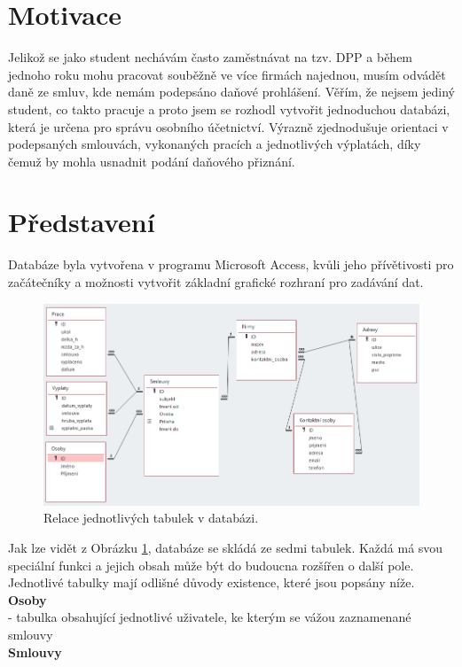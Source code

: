 \documentclass{article}
\begin{document}
	
	
	
	\section{Motivace}
	Jelikož se jako student nechávám často zaměstnávat na tzv. DPP a během jednoho roku mohu pracovat souběžně ve více firmách najednou, musím odvádět daně ze smluv, kde nemám podepsáno daňové prohlášení. Věřím, že nejsem jediný student, co takto pracuje a proto jsem se rozhodl vytvořit jednoduchou databázi, která je určena pro správu osobního účetnictví. Výrazně zjednodušuje orientaci v podepsaných smlouvách, vykonaných pracích a jednotlivých výplatách, díky čemuž by mohla usnadnit podání daňového přiznání.
	
	\section{Představení}
	Databáze byla vytvořena v programu Microsoft Access, kvůli jeho přívětivosti pro začátečníky a možnosti vytvořit základní grafické rozhraní pro zadávání dat.
	\begin{figure}[H]
		\centering
		\includegraphics[width=\textwidth]{./Graphics/relace}
		\caption{Relace jednotlivých tabulek v databázi.}
		\label{pic:relace}
	\end{figure}
	Jak lze vidět z Obrázku \ref{pic:relace}, databáze se skládá ze sedmi tabulek. Každá má svou speciální funkci a jejich obsah může být do budoucna rozšířen o další pole. Jednotlivé tabulky mají odlišné důvody existence, které jsou popsány níže.\\
	\textbf{Osoby}\\
	- tabulka obsahující jednotlivé uživatele, ke kterým se vážou zaznamenané smlouvy\\
	\textbf{Smlouvy}\\
\end{document}
